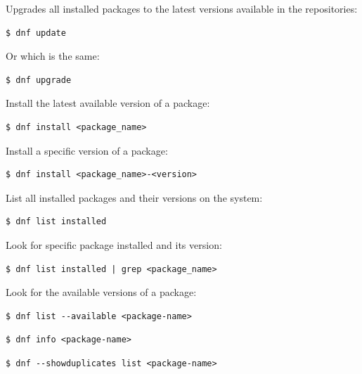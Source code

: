 \documentclass{article}
\newenvironment{codetemplate}[1][]{%
  \mybasecolorbox[#1]
  \itshape
}{%
  \endmybasecolorbox
}
\begin{document}
Upgrades all installed packages to the latest versions available in the repositories:
\begin{codetemplate}
\begin{verbatim}
$ dnf update
\end{verbatim}
\end{codetemplate}

Or which is the same:
\begin{codetemplate}
\begin{verbatim}
$ dnf upgrade
\end{verbatim}
\end{codetemplate}

Install the latest available version of a package:
\begin{codetemplate}
\begin{verbatim}
$ dnf install <package_name>
\end{verbatim}
\end{codetemplate}
    
Install a specific version of a package:
\begin{codetemplate}
\begin{verbatim}
$ dnf install <package_name>-<version>
\end{verbatim}
\end{codetemplate}

List all installed packages and their versions on the system:
\begin{codetemplate}
\begin{verbatim}
$ dnf list installed
\end{verbatim}
\end{codetemplate}

Look for specific package installed and its version:
\begin{codetemplate}
\begin{verbatim}
$ dnf list installed | grep <package_name>
\end{verbatim}
\end{codetemplate}

Look for the available versions of a package:
\begin{codetemplate}
\begin{verbatim}
$ dnf list --available <package-name>
\end{verbatim}
\end{codetemplate}
\begin{codetemplate}
\begin{verbatim}
$ dnf info <package-name>
\end{verbatim}
\end{codetemplate}
\begin{codetemplate}
\begin{verbatim}
$ dnf --showduplicates list <package-name>
\end{verbatim}
\end{codetemplate}
\end{document}
